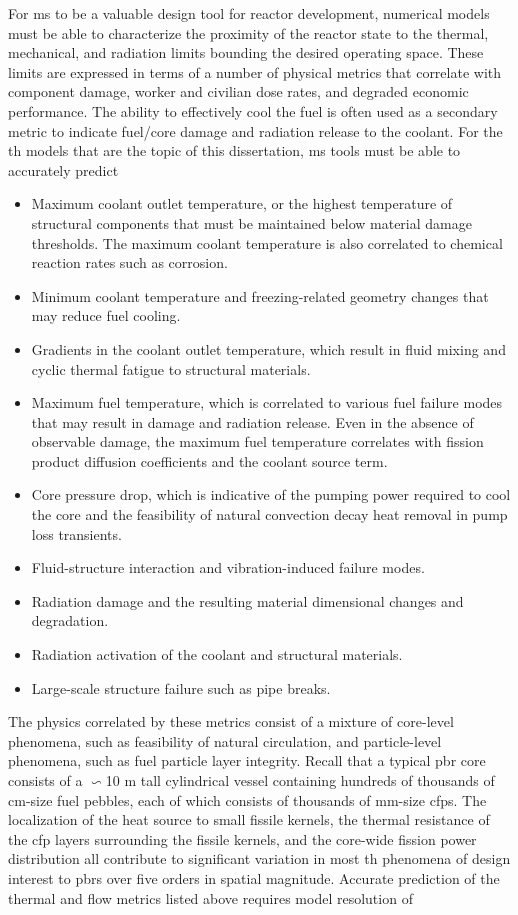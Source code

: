 For \gls{ms} to be a valuable design tool for reactor development, numerical models must be able to characterize the proximity of the reactor state to the thermal, mechanical, and radiation limits bounding the desired operating space. These limits are expressed in terms of a number of physical metrics that correlate with component damage, worker and civilian dose rates, and degraded economic performance. The ability to effectively cool the fuel is often used as a secondary metric to indicate fuel/core damage and radiation release to the coolant. For the \gls{th} models that are the topic of this dissertation, \gls{ms} tools must be able to accurately predict

\begin{itemize}
\item Maximum coolant outlet temperature, or the highest temperature of structural components that must be maintained below material damage thresholds. The maximum coolant temperature is also correlated to chemical reaction rates such as corrosion.
\item Minimum coolant temperature and freezing-related geometry changes that may reduce fuel cooling.
\item Gradients in the coolant outlet temperature, which result in fluid mixing and cyclic thermal fatigue to structural materials.
\item Maximum fuel temperature, which is correlated to various fuel failure modes that may result in damage and radiation release. Even in the absence of observable damage, the maximum fuel temperature correlates with fission product diffusion coefficients and the coolant source term.
\item Core pressure drop, which is indicative of the pumping power required to cool the core and the feasibility of natural convection decay heat removal in pump loss transients.
\item Fluid-structure interaction and vibration-induced failure modes.
\item Radiation damage and the resulting material dimensional changes and degradation.
\item Radiation activation of the coolant and structural materials.
\item Large-scale structure failure such as pipe breaks.
\end{itemize}

The physics correlated by these metrics consist of a mixture of core-level phenomena, such as feasibility of natural circulation, and particle-level phenomena, such as fuel particle layer integrity. Recall that a typical \gls{pbr} core consists of a $\backsim$10 \si{\meter} tall cylindrical vessel containing hundreds of thousands of \si{\centi\meter}-size fuel pebbles, each of which consists of thousands of \si{\milli\meter}-size \glspl{cfp}. The localization of the heat source to small fissile kernels, the thermal resistance of the \gls{cfp} layers surrounding the fissile kernels, and the core-wide fission power distribution all contribute to significant variation in most \gls{th} phenomena of design interest to \glspl{pbr} over five orders in spatial magnitude. Accurate prediction of the thermal and flow metrics listed above requires model resolution of

